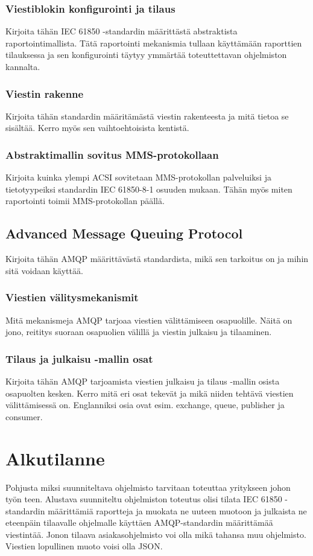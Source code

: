 \documentclass[globalnumbering,centeredcaptions,draftfooter]{tutthesis} %
\begin{document}
\subsection{Viestiblokin konfigurointi ja tilaus}
Kirjoita tähän IEC 61850 -standardin määrittästä abstraktista raportointimallista. Tätä raportointi mekanismia tullaan käyttämään raporttien tilauksessa ja sen konfigurointi täytyy ymmärtää toteuttettavan ohjelmiston kannalta.

\subsection{Viestin rakenne}
Kirjoita tähän standardin määritämästä viestin rakenteesta ja mitä tietoa se sisältää. Kerro myös sen vaihtoehtoisista kentistä.

\subsection{Abstraktimallin sovitus MMS-protokollaan}
Kirjoita kuinka ylempi ACSI sovitetaan MMS-protokollan palveluiksi ja tietotyypeiksi standardin IEC 61850-8-1 osuuden mukaan. Tähän myös miten raportointi toimii MMS-protokollan päällä.

\section{Advanced Message Queuing Protocol}
Kirjoita tähän AMQP määrittävästä standardista, mikä sen tarkoitus on ja mihin sitä voidaan käyttää.

\subsection{Viestien välitysmekanismit}
Mitä mekanismeja AMQP tarjoaa viestien välittämiseen osapuolille. Näitä on jono, reititys suoraan osapuolien välillä ja viestin julkaisu ja tilaaminen.

\subsection{Tilaus ja julkaisu -mallin osat}
Kirjoita tähän AMQP tarjoamista viestien julkaisu ja tilaus -mallin osista osapuolten kesken. Kerro mitä eri osat tekevät ja mikä niiden tehtävä viestien välittämisessä on. Englanniksi osia ovat esim. exchange, queue, publisher ja consumer.


\chapter{Alkutilanne}
\label{ch:alkutilanne}
Pohjusta miksi suunniteltava ohjelmisto tarvitaan toteuttaa yritykseen johon työn teen. Alustava suunniteltu ohjelmiston toteutus olisi tilata IEC 61850 -standardin määrittämiä raportteja ja muokata ne uuteen muotoon ja julkaista ne eteenpäin tilaavalle ohjelmalle käyttäen AMQP-standardin määrittämää viestintää. Jonon tilaava asiakasohjelmisto voi olla mikä tahansa muu ohjelmisto. Viestien lopullinen muoto voisi olla JSON.
\end{document}
